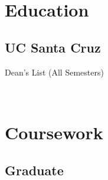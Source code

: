 \documentclass[letterpaper]{deedy-resume} %
\begin{document}




\begin{minipage}[t]{0.30\textwidth} %


\section{Education} 

\subsection{UC Santa Cruz }

Dean's List (All Semesters) \\
\sectionspace

\iffalse
\descript{M.S. in Computer Engineering}
\descript{(Awaiting Acceptance)}
\location{Expected May 2020}
4 $+$ 1 B.S/M.S. program\\
Currently taking graduate level classes to apply to my M.S. degree upon acceptance 
\sectionspace %
\fi 

\

\section{Coursework}

\subsection{Graduate}


\end{minipage}
\end{document}
